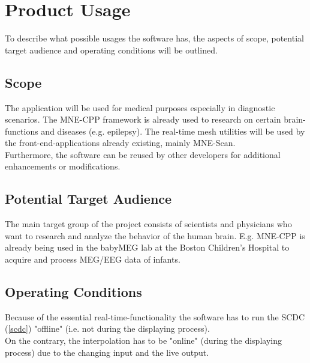 \section{Product Usage}
To describe what possible usages the software has, the aspects of scope, potential target audience and operating conditions will be outlined. 
\subsection{Scope}\label{3_1_scope}
The application will be used for medical purposes especially in diagnostic scenarios. The MNE-CPP framework is already used to research on certain brain-functions and diseases (e.g. epilepsy). The real-time mesh utilities will be used by the front-end-applications already existing, mainly MNE-Scan.\\
Furthermore, the software can be reused by other developers for additional enhancements or modifications.


\subsection{Potential Target Audience}
The main target group of the project consists of scientists and physicians who want to research and analyze the behavior of the human brain. E.g. MNE-CPP is already being used in the babyMEG lab at the Boston Children's Hospital to acquire and process MEG/EEG data of infants.

\subsection{Operating Conditions}
Because of the essential real-time-functionality the software has to run the SCDC (\ref{scdc}) "offline" (i.e. not during the displaying process). \\
On the contrary, the interpolation has to be "online" (during the displaying process) due to the changing input and the live output.
